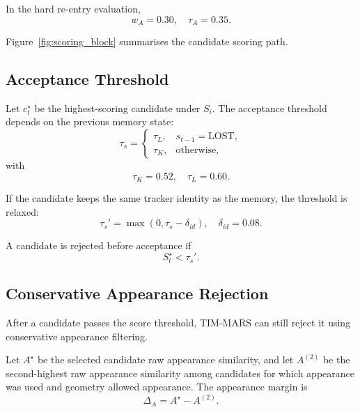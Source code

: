 In the hard re-entry evaluation,
\begin{equation}
w_A = 0.30,
\quad
\tau_A = 0.35.
\end{equation}

Figure~\ref{fig:scoring_block} summarises the candidate scoring path.



\subsection{Acceptance Threshold}

Let $c_t^\star$ be the highest-scoring candidate under $S_i$. The acceptance threshold depends on the previous memory state:
\begin{equation}
\tau_s =
\begin{cases}
\tau_L, & s_{t-1} = \mathrm{LOST},\\
\tau_K, & \mathrm{otherwise},
\end{cases}
\end{equation}
with
\begin{equation}
\tau_K = 0.52,
\quad
\tau_L = 0.60.
\end{equation}

If the candidate keeps the same tracker identity as the memory, the threshold is relaxed:
\begin{equation}
\tau_s' =
\max(0,\tau_s - \delta_{id}),
\quad
\delta_{id}=0.08.
\end{equation}

A candidate is rejected before acceptance if
\begin{equation}
S_t^\star < \tau_s'.
\end{equation}

\subsection{Conservative Appearance Rejection}

After a candidate passes the score threshold, TIM-MARS can still reject it using conservative appearance filtering.

Let $A^\star$ be the selected candidate raw appearance similarity, and let $A^{(2)}$ be the second-highest raw appearance similarity among candidates for which appearance was used and geometry allowed appearance. The appearance margin is
\begin{equation}
\Delta_A = A^\star - A^{(2)}.
\end{equation}


